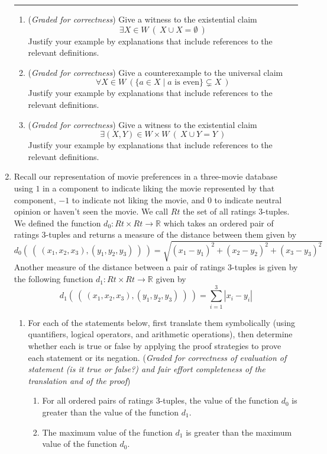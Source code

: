\begin{enumerate}
   \rule{0.5\textwidth}{.4pt}
   
   
   \begin{enumerate}
   \item ({\it Graded for correctness}) Give a witness to the existential claim
   $$ \exists X \in W ~(~X \cup X = \emptyset~)$$
   Justify your example by explanations that include references to the relevant definitions.
   
   \item ({\it Graded for correctness}) Give a counterexample to the universal claim
   $$ \forall X \in W ~( \{ a \in X \mid a \textrm{ is even} \} \subsetneq X~)$$
   Justify your example by explanations 
   that include references to the relevant definitions.
   
   \item  ({\it Graded for correctness}) Give a witness to the existential claim
   $$ \exists (X,Y) \in W \times W ~(~X \cup Y = Y~)$$
   Justify your example by explanations that include references to the relevant definitions.
   \end{enumerate}
   

   \item Recall our representation of movie preferences in a three-movie database 
   using $1$ in a component to indicate liking the movie represented by that component, 
   $-1$ to indicate not liking the movie, and $0$ to indicate neutral opinion or
   haven't seen the movie. We call $Rt$ the set of all ratings $3$-tuples. 
   We defined the function 
   $d_0: Rt\times Rt \to \mathbb{R}$ which takes an ordered pair of ratings $3$-tuples and returns a measure
   of the distance between them 
   given by
   \[
   d_0 (~(~ (x_1, x_2, x_3), (y_1, y_2, y_3) ~) ~) = \sqrt{ (x_1 - y_1)^2 + (x_2 - y_2)^2 + (x_3 -y_3)^2}
   \]
   Another measure of the distance between a pair of ratings $3$-tuples is given by 
   the following function $d_1: Rt\times Rt \to \mathbb{R}$ given by 
   \[
   d_1 (~(~ (x_1, x_2, x_3), (y_1, y_2, y_3) ~) ~) = \sum_{i=1}^3 |x_i - y_i|
   \]
   \begin{enumerate}
    \item    For each of the statements below, first translate them symbolically (using
        quantifiers, logical operators, and arithmetic operations), then determine whether each 
        is true or false by applying the proof strategies to prove each statement or its negation.
        ({\it Graded for correctness of evaluation of statement (is it true or false?) and 
        fair effort completeness of the translation and of the proof}) 
        \begin{enumerate}
            \item For all ordered pairs of ratings $3$-tuples, the value of the function $d_0$ 
            is greater than the value of the function $d_1$.
            \item The maximum value of the function $d_1$ is greater than the maximum value of the function $d_0$.
        \end{enumerate}


\end{enumerate}
\end{enumerate}
